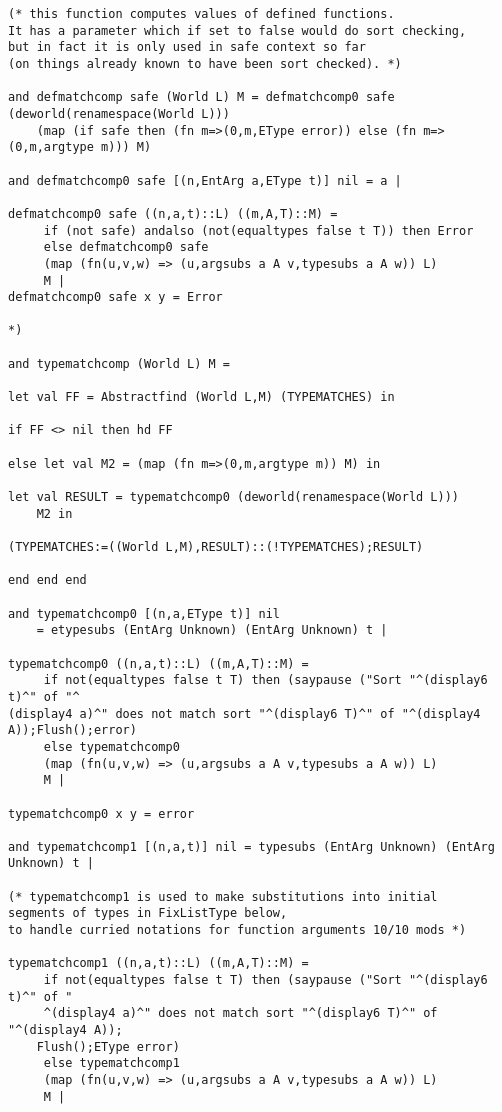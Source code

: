 \documentclass{article}
\begin{document}
\begin{verbatim}
(* this function computes values of defined functions.
It has a parameter which if set to false would do sort checking,
but in fact it is only used in safe context so far 
(on things already known to have been sort checked). *)

and defmatchcomp safe (World L) M = defmatchcomp0 safe (deworld(renamespace(World L))) 
    (map (if safe then (fn m=>(0,m,EType error)) else (fn m=>(0,m,argtype m))) M)

and defmatchcomp0 safe [(n,EntArg a,EType t)] nil = a |

defmatchcomp0 safe ((n,a,t)::L) ((m,A,T)::M) =
     if (not safe) andalso (not(equaltypes false t T)) then Error
     else defmatchcomp0 safe
     (map (fn(u,v,w) => (u,argsubs a A v,typesubs a A w)) L)
     M |
defmatchcomp0 safe x y = Error

*)

and typematchcomp (World L) M = 

let val FF = Abstractfind (World L,M) (TYPEMATCHES) in

if FF <> nil then hd FF

else let val M2 = (map (fn m=>(0,m,argtype m)) M) in

let val RESULT = typematchcomp0 (deworld(renamespace(World L)))
    M2 in

(TYPEMATCHES:=((World L,M),RESULT)::(!TYPEMATCHES);RESULT)

end end end

and typematchcomp0 [(n,a,EType t)] nil 
    = etypesubs (EntArg Unknown) (EntArg Unknown) t |

typematchcomp0 ((n,a,t)::L) ((m,A,T)::M) =
     if not(equaltypes false t T) then (saypause ("Sort "^(display6 t)^" of "^
(display4 a)^" does not match sort "^(display6 T)^" of "^(display4 A));Flush();error)
     else typematchcomp0
     (map (fn(u,v,w) => (u,argsubs a A v,typesubs a A w)) L)
     M |

typematchcomp0 x y = error

and typematchcomp1 [(n,a,t)] nil = typesubs (EntArg Unknown) (EntArg Unknown) t |

(* typematchcomp1 is used to make substitutions into initial
segments of types in FixListType below, 
to handle curried notations for function arguments 10/10 mods *)

typematchcomp1 ((n,a,t)::L) ((m,A,T)::M) =
     if not(equaltypes false t T) then (saypause ("Sort "^(display6 t)^" of "
     ^(display4 a)^" does not match sort "^(display6 T)^" of "^(display4 A));
    Flush();EType error)
     else typematchcomp1
     (map (fn(u,v,w) => (u,argsubs a A v,typesubs a A w)) L)
     M |


\end{verbatim}
\end{document}
